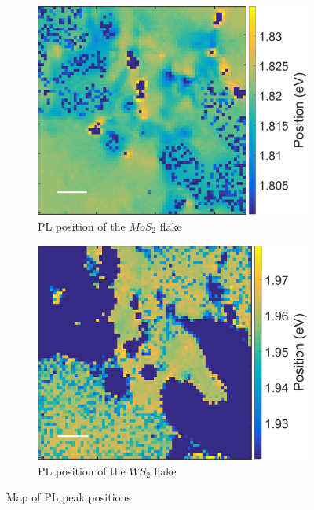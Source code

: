 \begin{figure}[h]
	\begin{center}
		\begin{subfigure}[b]{0.5\textwidth}
			\includegraphics[scale=0.25]{Heterostructures/PLPositionMap21.png}
			\caption{PL position of the $MoS_2$ flake}
			\label{fig:HeterostructuresPLPosition21Map}
		\end{subfigure}
		\begin{subfigure}[b]{0.45\textwidth}
			\includegraphics[scale=0.25]{Heterostructures/PLPositionMap22.png}
		\caption{PL position of the $WS_2$ flake}
		\label{fig:HeterostructuresPLPosition22Map}
		\end{subfigure}
		\caption{Map of PL peak positions}
		\label{fig:HeterostructuresPLPositionsMap}
	\end{center}
\end{figure}

